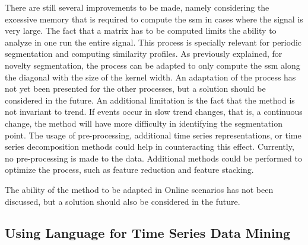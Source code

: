 \par
There are still several improvements to be made, namely considering the excessive memory that is required to compute the \gls{ssm} in cases where the signal is very large. The fact that a matrix has to be computed limits the ability to analyze in one run the entire signal. This process is specially relevant for periodic segmentation and computing similarity profiles. As previously explained, for novelty segmentation, the process can be adapted to only compute the \gls{ssm} along the diagonal with the size of the kernel width. An adaptation of the process has not yet been presented for the other processes, but a solution should be considered in the future. An additional limitation is the fact that the method is not invariant to trend. If events occur in slow trend changes, that is, a continuous change, the method will have more difficulty in identifying the segmentation point. The usage of pre-processing, additional time series representations, or time series decomposition methods could help in counteracting this effect. Currently, no pre-processing is made to the data. Additional methods could be performed to optimize the process, such as feature reduction and feature stacking.
\par
The ability of the method to be adapted in Online scenarios has not been discussed, but a solution should also be considered in the future.

\subsection{Using Language for Time Series Data Mining}

